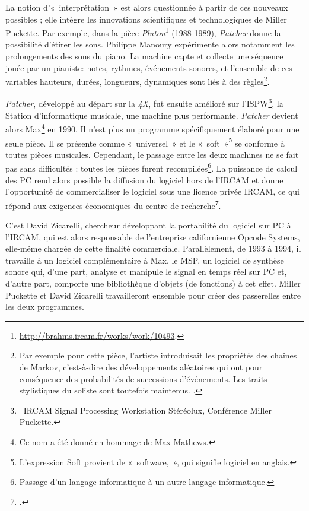 \documentclass{FramateX}
\begin{document}
\begin{refsection}
La notion d'«~interprétation~» est alors questionnée à partir de ces
nouveaux possibles ; elle intègre les innovations scientifiques et
technologiques de Miller Puckette. Par exemple, dans la pièce
\textit{Pluton}\footnote{\url{http://brahms.ircam.fr/works/work/10493}.}
(1988-1989), \textit{Patcher} donne la possibilité d'étirer les sons. Philippe
Manoury expérimente alors notamment les prolongements des sons du
piano. La machine capte et collecte une séquence jouée par un pianiste: notes, rythmes, 
événements sonores, et l'ensemble de ces variables
hauteurs, durées, longueurs, dynamiques sont liés à des
règles\footnote{Par exemple pour cette pièce, l'artiste introduisait
les propriétés des chaînes de Markov, c'est-à-dire des développements
aléatoires qui ont pour conséquence des probabilités de successions
d'événements. Les traits stylistiques du soliste sont toutefois
maintenus. \cite[p.~111]{Langer2001}.}.

\textit{Patcher}, développé au départ sur la \textit{4X}, fut ensuite amélioré sur
l'ISPW\footnote{~IRCAM Signal Processing Workstation Stéréolux,
Conférence Miller Puckette.}, la Station d'informatique musicale, une
machine plus performante. \textit{Patcher} devient alors Max\footnote{Ce nom a
été donné en hommage de Max Mathews.} en 1990. Il n'est plus un
programme spécifiquement élaboré pour une seule pièce. Il se présente
comme «~universel~» et le
«~soft~»\footnote{L'expression Soft provient de
«~software,~», qui signifie logiciel en anglais.} se conforme à toutes
pièces musicales. Cependant, le passage entre les deux machines ne se
fait pas sans difficultés : toutes les pièces furent
recompilées\footnote{Passage d'un langage
informatique à un autre langage informatique.}. La puissance de calcul
des PC rend alors possible la diffusion du logiciel hors de l'IRCAM et
donne l'opportunité de commercialiser le logiciel sous une licence
privée IRCAM, ce qui répond aux exigences économiques du centre de
recherche\footnote{\cite{Combes2007}.}.

C'est David Zicarelli, chercheur développant la
portabilité du logiciel sur PC à l'IRCAM, qui est alors responsable de
l'entreprise californienne Opcode Systems, elle-même chargée de cette
finalité commerciale. Parallèlement, de 1993 à 1994, il travaille à un
logiciel complémentaire à Max, le MSP, un logiciel de synthèse sonore
qui, d'une part, analyse et manipule le signal en temps réel sur PC et,
d'autre part, comporte une bibliothèque d'objets (de fonctions) à cet
effet. Miller Puckette et David Zicarelli travailleront ensemble pour
créer des passerelles entre les deux programmes.


\end{refsection}
\end{document}
